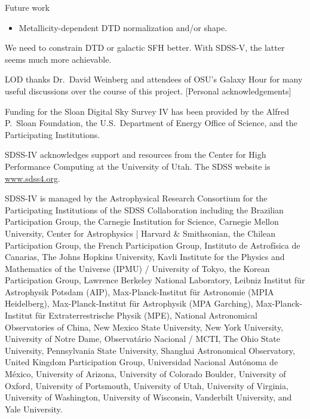 \documentclass[twocolumn,twocolappendix,linenumbers,trackchanges]{aastex631}
\begin{document}
Future work
\begin{itemize}
    \item Metallicity-dependent DTD normalization and/or shape.
\end{itemize}

We need to constrain DTD or galactic SFH better. With SDSS-V, the latter seems much more achievable.

\begin{acknowledgments}
    LOD thanks Dr.\ David Weinberg and attendees of OSU's Galaxy Hour for many useful discussions over the course of this project.
    [Personal acknowledgements]
    
    Funding for the Sloan Digital Sky 
    Survey IV has been provided by the 
    Alfred P.\ Sloan Foundation, the U.S.\ 
    Department of Energy Office of 
    Science, and the Participating 
    Institutions. 
    
    SDSS-IV acknowledges support and 
    resources from the Center for High 
    Performance Computing  at the 
    University of Utah. The SDSS 
    website is \url{www.sdss4.org}.
    
    SDSS-IV is managed by the 
    Astrophysical Research Consortium 
    for the Participating Institutions 
    of the SDSS Collaboration including 
    the Brazilian Participation Group, 
    the Carnegie Institution for Science, 
    Carnegie Mellon University, Center for 
    Astrophysics | Harvard \& 
    Smithsonian, the Chilean Participation 
    Group, the French Participation Group, 
    Instituto de Astrof\'isica de 
    Canarias, The Johns Hopkins 
    University, Kavli Institute for the 
    Physics and Mathematics of the 
    Universe (IPMU) / University of 
    Tokyo, the Korean Participation Group, 
    Lawrence Berkeley National Laboratory, 
    Leibniz Institut f\"ur Astrophysik 
    Potsdam (AIP),  Max-Planck-Institut 
    f\"ur Astronomie (MPIA Heidelberg), 
    Max-Planck-Institut f\"ur 
    Astrophysik (MPA Garching), 
    Max-Planck-Institut f\"ur 
    Extraterrestrische Physik (MPE), 
    National Astronomical Observatories of 
    China, New Mexico State University, 
    New York University, University of 
    Notre Dame, Observat\'ario 
    Nacional / MCTI, The Ohio State 
    University, Pennsylvania State 
    University, Shanghai 
    Astronomical Observatory, United 
    Kingdom Participation Group, 
    Universidad Nacional Aut\'onoma 
    de M\'exico, University of Arizona, 
    University of Colorado Boulder, 
    University of Oxford, University of 
    Portsmouth, University of Utah, 
    University of Virginia, University 
    of Washington, University of 
    Wisconsin, Vanderbilt University, 
    and Yale University.
    

\end{acknowledgments}
\end{document}
